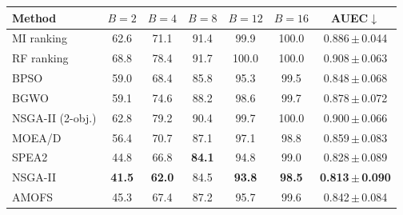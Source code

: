 \begin{tabular}{lcccccc}
\toprule
Method & $B=2$ & $B=4$ & $B=8$ & $B=12$ & $B=16$ & AUEC$\downarrow$ \\
\midrule
MI ranking & 62.6 & 71.1 & 91.4 & 99.9 & 100.0 & 0.886\,$\pm$\,0.044 \\
RF ranking & 68.8 & 78.4 & 91.7 & 100.0 & 100.0 & 0.908\,$\pm$\,0.063 \\
BPSO & 59.0 & 68.4 & 85.8 & 95.3 & 99.5 & 0.848\,$\pm$\,0.068 \\
BGWO & 59.1 & 74.6 & 88.2 & 98.6 & 99.7 & 0.878\,$\pm$\,0.072 \\
NSGA-II (2-obj.) & 62.8 & 79.2 & 90.4 & 99.7 & 100.0 & 0.900\,$\pm$\,0.066 \\
MOEA/D & 56.4 & 70.7 & 87.1 & 97.1 & 98.8 & 0.859\,$\pm$\,0.083 \\
SPEA2 & 44.8 & 66.8 & \textbf{84.1} & 94.8 & 99.0 & 0.828\,$\pm$\,0.089 \\
NSGA-II & \textbf{41.5} & \textbf{62.0} & 84.5 & \textbf{93.8} & \textbf{98.5} & \textbf{0.813\,$\pm$\,0.090} \\
AMOFS & 45.3 & 67.4 & 87.2 & 95.7 & 99.6 & 0.842\,$\pm$\,0.084 \\
\bottomrule
\end{tabular}
